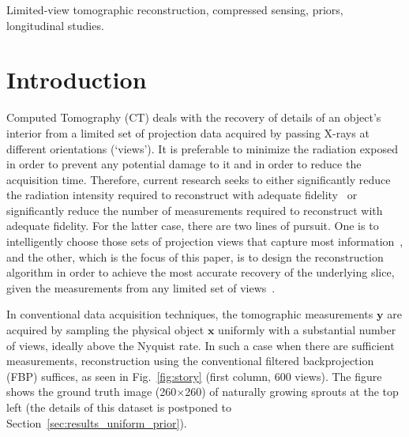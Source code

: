\documentclass[journal]{IEEEtran}
\begin{document}
\begin{IEEEkeywords}
Limited-view tomographic reconstruction, compressed sensing, priors, longitudinal studies.
\end{IEEEkeywords}


%
\IEEEpeerreviewmaketitle



\section{Introduction}
\label{sec:intro}
Computed Tomography (CT) deals with the recovery of details of an
object's interior
from a limited set of projection data acquired by passing
X-rays at different orientations (`views'). It is preferable to
minimize the radiation exposed in order to prevent any potential
damage to it and in order to reduce the acquisition time. Therefore,
current research seeks to either significantly reduce the radiation
intensity required to reconstruct with adequate
fidelity~\cite{yang2018,Lin2016,Xie2017,gopal2019low} or significantly
reduce the number of measurements required to reconstruct with
adequate fidelity. For the latter case, there are two lines of
pursuit. One is to intelligently choose those sets of projection views
that capture most
information~\cite{King2018,Anthony2018,barkan17,fischer16,andrei14},
and the other, which is the focus of this paper, is to design the
reconstruction algorithm in order to achieve the most accurate
recovery of the underlying slice, given the measurements from any
limited set of views~\cite{yang2018,geyer2015,kilic2011}.

In conventional data acquisition techniques, the tomographic
measurements $\boldsymbol{y}$ are acquired by sampling the physical
object $\boldsymbol{x}$ uniformly with a substantial number of views,
ideally above the Nyquist rate. In such a case when there are
sufficient measurements, reconstruction using the conventional
filtered backprojection (FBP) suffices, as seen in
Fig.~\ref{fig:story} (first column, 600 views). The figure shows the
ground truth image (260$\times$260) of naturally growing sprouts at the top
left (the details of this dataset is postponed to
Section~\ref{sec:results_uniform_prior}).
\end{document}
